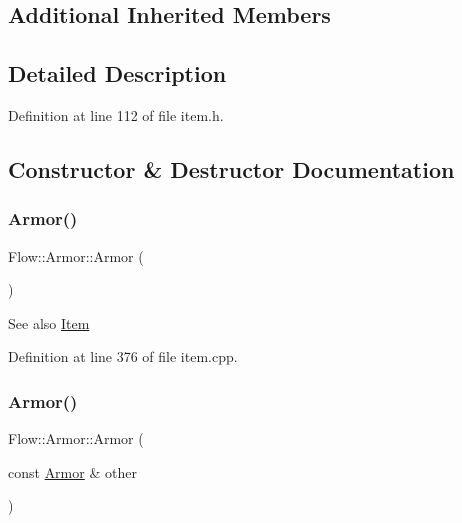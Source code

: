 \subsection*{Additional Inherited Members}


\subsection{Detailed Description}


Definition at line 112 of file item.\+h.



\subsection{Constructor \& Destructor Documentation}
\hypertarget{class_flow_1_1_armor_afadde01c20f1c7670b36f67767459b54}{}\label{class_flow_1_1_armor_afadde01c20f1c7670b36f67767459b54} 
\subsubsection{\texorpdfstring{Armor()}{Armor()}\hspace{0.1cm}{\footnotesize\ttfamily [1/4]}}
{\footnotesize\ttfamily Flow\+::\+Armor\+::\+Armor (\begin{DoxyParamCaption}{ }\end{DoxyParamCaption})}

\begin{DoxySeeAlso}{See also}
\hyperlink{class_flow_1_1_item}{Item} 
\end{DoxySeeAlso}


Definition at line 376 of file item.\+cpp.

\hypertarget{class_flow_1_1_armor_a36f8f3c519b47009563e8feac8405218}{}\label{class_flow_1_1_armor_a36f8f3c519b47009563e8feac8405218} 
\subsubsection{\texorpdfstring{Armor()}{Armor()}\hspace{0.1cm}{\footnotesize\ttfamily [2/4]}}
{\footnotesize\ttfamily Flow\+::\+Armor\+::\+Armor (\begin{DoxyParamCaption}\item[{const \hyperlink{class_flow_1_1_armor}{Armor} \&}]{other }\end{DoxyParamCaption})}

